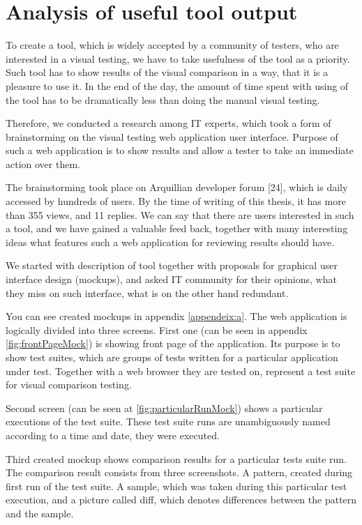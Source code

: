 \documentclass[11pt,oneside,final]{fithesis2}
\begin{document}
  \newpage
  \section{Analysis of useful tool output}
  To create a tool, which is widely accepted by a community of testers, who are interested in a visual testing, we have to take usefulness of the tool as a priority. Such tool has to show results
  of the visual comparison in a way, that it is a pleasure to use it. In the end of the day, the amount of time spent with using of the tool has to be dramatically less than doing the manual
  visual testing.
   
  Therefore, we conducted a research among IT experts, which took a form of brainstorming on the visual testing web application user interface. Purpose of such a web application is to show
  results and allow a tester to take an immediate action over them.
  
  The brainstorming took place on Arquillian developer forum [24], which is daily accessed by hundreds of users. By the time of writing of this thesis, it has more than 355 views, 
  and 11 replies. We can say that there are users interested in such a tool, and we have gained a valuable feed back, together with many interesting ideas what features such a web application
  for reviewing results should have.
  
  We started with description of tool together with proposals for graphical user interface design (mockups), and asked IT community for their
  opinions, what they miss on such interface, what is on the other hand redundant.
  
  You can see created mockups in appendix \ref{appendeix:a}. The web application is logically divided into
  three screens. First one (can be seen in appendix \ref{fig:frontPageMock}) is showing front page of the application. Its purpose
  is to show test suites, which are groups of tests written for a particular application under test.
  Together with a web browser they are tested on, represent a test suite for visual comparison testing.
  
  Second screen (can be seen at \ref{fig:particularRunMock}) shows a particular executions of the test suite. These test
  suite runs are unambiguously named according to a time and date, they were executed.
  
  Third created mockup shows comparison results for a particular tests suite run. The comparison result
  consists from three screenshots. A pattern, created during first run of the test suite. A sample, which
  was taken during this particular test execution, and a picture called diff, which denotes differences
  between the pattern and the sample.
  
\end{document}
